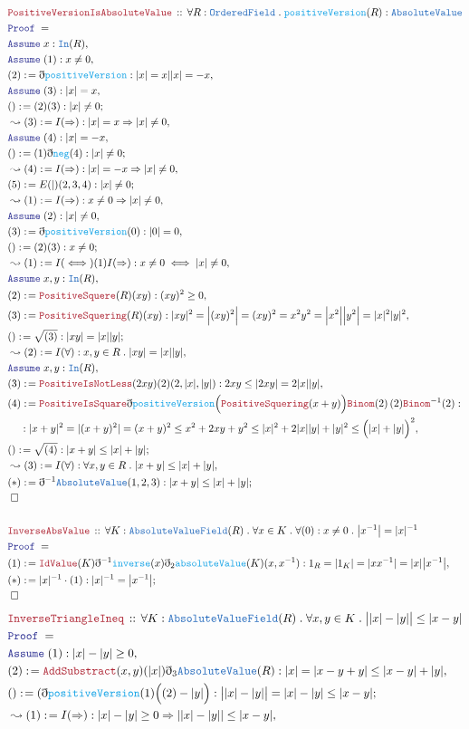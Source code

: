\documentclass[12pt]{scrartcl}
\newcommand{\TYPE}[1]{\textcolor{NavyBlue}{\mathtt{#1}}}
\newcommand{\FUNC}[1]{\textcolor{Cerulean}{\mathtt{#1}}}
\newcommand{\LOGIC}[1]{\textcolor{Blue}{\mathtt{#1}}}
\newcommand{\THM}[1]{\textcolor{Maroon}{\mathtt{#1}}}
\renewcommand{\.}{\; . \;}
\newcommand{\de}{: \kern 0.1pc =}
\newcommand{\Theorem}[2]{& \THM{#1} \, :: \, #2 \\ & \Proof = \\ }
\newcommand{\NewLine}{\\ & \kern 1pc}
\newcommand{\Page}[1]{ \begin{align*} #1 \end{align*}   }
\newcommand{ \bd }{ \ByDef }
\newcommand{\Say}[3]{& #1 \de #2 : #3, \\}
\newcommand{\Conclude}[3]{& #1 \de #2 : #3; \\}
\newcommand{\Derive}[3]{& \leadsto #1 \de #2 : #3, \\}
\newcommand{\A}{\LOGIC{Assume} \;}
\newcommand{\Assume}[2]{& \A #1 : #2, \\}
\newcommand{\QED}{\; \square}
\newcommand{\EndProof}{& \QED \\}
\newcommand{\ByDef}{\eth}
\newcommand{\Proof}{\LOGIC{Proof} \; }
\newcommand{\OF}{\TYPE{OrderedField}}
\begin{document}
\Page{
\Theorem{PositiveVersionIsAbsoluteValue}{ \forall R : \OF \.  \FUNC{positiveVersion}(R) : \TYPE{AbsoluteValue}  }
\Assume{x}{\TYPE{In}(R)}
\Assume{(1)}{x \neq 0}
\Say{(2)}{\bd \FUNC{positiveVersion}}{ |x| = x | |x| = -x}
\Assume{(3)}{|x| =  x}
\Conclude{()}{ (2)(3) }{ |x| \neq 0  }
\Derive{(3)}{I(\Rightarrow) }{ |x| = x \Rightarrow |x| \neq 0 }
\Assume{(4)}{|x| = -x}
\Conclude{()}{ (1)\bd\FUNC{neg}(4) }{|x| \neq 0}
\Derive{(4)}{I(\Rightarrow)}{ |x|  = -x \Rightarrow |x| \neq 0  }
\Conclude{(5)}{E(|)(2,3,4)}{ |x| \neq 0  }
\Derive{(1)}{I(\Rightarrow) }{ x \neq 0 \Rightarrow |x| \neq 0 }
\Assume{(2)}{|x| \neq  0}
\Say{(3)}{\bd \FUNC{positiveVersion}(0)}{ |0| = 0 }
\Conclude{()}{ (2)(3) }{ x \neq 0 }
\Derive{(1)}{I(\iff)(1)I(\Rightarrow) }{ x \neq  0 \iff |x| \neq 0}
\Assume{x,y}{\TYPE{In}(R)}
\Say{(2)}{\THM{PositiveSquere}(R)(xy)}{ (xy)^2 \ge 0 }
\Say{(3)}{\THM{PositiveSquering}(R)(xy)}
{  |xy|^2 =   \Big|(xy )^2\Big| =  (xy)^2  = x^2y^2 = \Big| x^2 \Big| \Big|  y^2\Big| = |x|^2|y|^2   }
\Conclude{()}{ \sqrt{(3)} }{|xy| = |x||y|}
\Derive{(2)}{I(\forall)}{ x,y \in R \. |xy| = |x||y|}
\Assume{x,y}{\TYPE{In}(R)}
\Say{(3)}{ \THM{PositiveIsNotLess}(2xy)(2)(2,|x|,|y|)  }{ 2xy \le |2xy| = 2|x||y|  }
\Say{(4)}{ \THM{PositiveIsSquare}\bd \FUNC{positiveVersion}\Big(\THM{PositiveSquering}(x + y) \Big)   
\THM{Binom}(2)\, (2) \THM{Binom}^{-1}(2) 
}{ 
\NewLine :
| x + y |^2  = |(x + y)^2| =  (x + y)^2 \le x^2 + 2xy + y^2 \le |x|^2 + 2|x||y| + |y|^2 \le \Big(|x| + |y|\Big)^2  }
\Conclude{()}{\sqrt{(4)} }{ |x + y| \le |x| + |y|  }
\Derive{(3)}{I(\forall)}{\forall x,y \in R \. |x + y| \le |x| + |y|}
\Conclude{(*)}{\bd^{-1}\TYPE{AbsoluteValue}(1,2,3)}{|x + y| \le |x| + |y|}
\EndProof
\\
\Theorem{InverseAbsValue}{\forall K : \TYPE{AbsoluteValueField}(R) \. \forall x \in K \. \forall (0) : x \neq 0 \. 
\big| x^{-1} \big| = | x |^{-1}}
\Say{(1)}{\THM{IdValue}(K)\bd^{-1} \FUNC{inverse}(x) \bd_2 \FUNC{absoluteValue}(K)(x,x^{-1})   }
{1_R = |1_K| = |xx^{-1}| = |x|\big|x^{-1}\big|}
\Conclude{(*)}{|x|^{-1} \cdot (1)}{  |x|^{-1} = \big| x^{-1} \big|  }
\EndProof
}\Page{
\Theorem{InverseTriangleIneq}{\forall K : \TYPE{AbsoluteValueField}(R) \. \forall x,y \in K \. 
\big||x| - |y|\big| \le |x -  y|  }
\Assume{ (1) }{ |x| - |y| \ge 0 }
\Say{(2)}{\THM{AddSubstract}(x,y)(|x|)\bd_3\TYPE{AbsoluteValue}(R)}{ |x| = | x - y + y| \le |x - y| + |y| }
\Conclude{()}{( \bd \FUNC{positiveVersion}(1) \Big((2) - |y|\Big)}{  \big||x| - |y|\big| = |x| - |y| \le  |x - y| }
\Derive{(1)}{I(\Rightarrow)}{ |x| - |y| \ge 0 \Rightarrow | |x| - |y| | \le |x - y|  }
}
\end{document}
